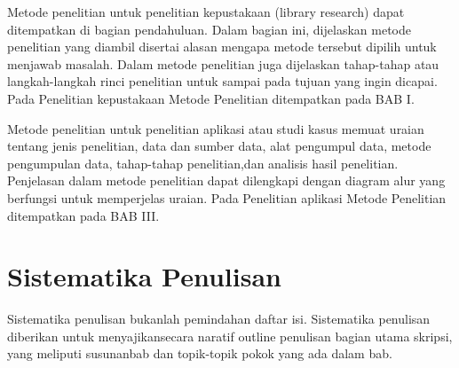 Metode penelitian untuk penelitian kepustakaan (library research) dapat ditempatkan di bagian pendahuluan. Dalam bagian ini, dijelaskan metode penelitian yang diambil disertai alasan mengapa metode tersebut dipilih untuk menjawab masalah. Dalam metode penelitian juga dijelaskan tahap-tahap atau langkah-langkah rinci penelitian untuk sampai pada tujuan yang ingin dicapai. Pada Penelitian kepustakaan Metode Penelitian ditempatkan pada BAB I.

Metode penelitian untuk penelitian aplikasi atau studi kasus memuat uraian tentang jenis penelitian, data dan sumber data, alat pengumpul data, metode pengumpulan data, tahap-tahap penelitian,dan analisis hasil penelitian. Penjelasan dalam metode penelitian dapat dilengkapi dengan diagram alur yang berfungsi untuk memperjelas uraian. Pada Penelitian aplikasi Metode Penelitian ditempatkan pada BAB III.
\section{Sistematika Penulisan}

Sistematika penulisan bukanlah pemindahan daftar isi. Sistematika penulisan diberikan untuk menyajikansecara naratif outline penulisan bagian utama skripsi, yang meliputi susunanbab dan topik-topik pokok yang ada dalam bab.